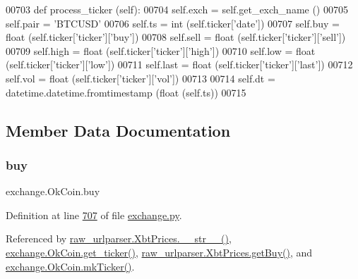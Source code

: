 \begin{DoxyCode}
00703     \textcolor{keyword}{def }process\_ticker (self):
00704         self.exch = self.get\_exch\_name ()
00705         self.pair = \textcolor{stringliteral}{'BTCUSD'}
00706         self.ts   = int   (self.ticker[\textcolor{stringliteral}{'date'}])
00707         self.buy  = float (self.ticker[\textcolor{stringliteral}{'ticker'}][\textcolor{stringliteral}{'buy'}])
00708         self.sell = float (self.ticker[\textcolor{stringliteral}{'ticker'}][\textcolor{stringliteral}{'sell'}])
00709         self.high = float (self.ticker[\textcolor{stringliteral}{'ticker'}][\textcolor{stringliteral}{'high'}])
00710         self.low  = float (self.ticker[\textcolor{stringliteral}{'ticker'}][\textcolor{stringliteral}{'low'}])
00711         self.last = float (self.ticker[\textcolor{stringliteral}{'ticker'}][\textcolor{stringliteral}{'last'}])
00712         self.vol  = float (self.ticker[\textcolor{stringliteral}{'ticker'}][\textcolor{stringliteral}{'vol'}])
00713     
00714         self.dt = datetime.datetime.fromtimestamp (float (self.ts))
00715     
\end{DoxyCode}


\subsection{Member Data Documentation}
\mbox{\label{classexchange_1_1_ok_coin_aaf828e37142a83cbfb12d193313f6d43}} 
\subsubsection{\texorpdfstring{buy}{buy}}
{\footnotesize\ttfamily exchange.\+Ok\+Coin.\+buy}



Definition at line \hyperlink{exchange_8py_source_l00707}{707} of file \hyperlink{exchange_8py_source}{exchange.\+py}.



Referenced by \hyperlink{raw__urlparser_8py_source_l00074}{raw\+\_\+urlparser.\+Xbt\+Prices.\+\_\+\+\_\+str\+\_\+\+\_\+()}, \hyperlink{exchange_8py_source_l00716}{exchange.\+Ok\+Coin.\+get\+\_\+ticker()}, \hyperlink{raw__urlparser_8py_source_l00062}{raw\+\_\+urlparser.\+Xbt\+Prices.\+get\+Buy()}, and \hyperlink{exchange_8py_source_l00730}{exchange.\+Ok\+Coin.\+mk\+Ticker()}.

